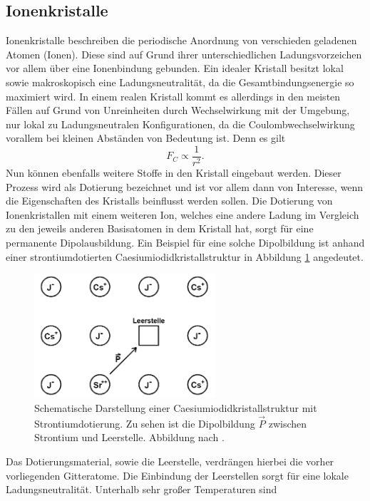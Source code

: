 \subsection{Ionenkristalle}
Ionenkristalle beschreiben die periodische Anordnung von verschieden geladenen Atomen (Ionen). Diese sind auf Grund ihrer unterschiedlichen Ladungsvorzeichen vor allem über eine Ionenbindung 
gebunden. Ein idealer Kristall besitzt lokal sowie makroskopisch eine Ladungsneutralität, da die Gesamtbindungsenergie so maximiert wird. In einem realen Kristall kommt es allerdings in den meisten Fällen auf Grund von 
Unreinheiten durch Wechselwirkung mit der Umgebung,
nur lokal zu Ladungsneutralen Konfigurationen, da die Coulombwechselwirkung vorallem bei kleinen Abständen von Bedeutung ist. Denn es gilt
\begin{equation*}
F_{C} \propto \frac{1}{r^2}.
\end{equation*}
\newline
Nun können ebenfalls weitere Stoffe in den Kristall eingebaut werden. Dieser Prozess wird als Dotierung bezeichnet und ist vor allem dann von Interesse, wenn die Eigenschaften des Kristalls 
beinflusst werden sollen. Die Dotierung von Ionenkristallen mit einem weiteren Ion, welches eine andere Ladung im Vergleich zu den jeweils anderen Basisatomen in dem Kristall hat, sorgt für eine permanente Dipolausbildung.
Ein Beispiel für eine solche Dipolbildung ist anhand einer strontiumdotierten Caesiumiodidkristallstruktur in Abbildung \ref{fig:theo1} angedeutet.
\begin{figure}
    \centering
    \includegraphics[width=0.6\textwidth]{bilder/theo1.png}
    \caption{Schematische Darstellung einer Caesiumiodidkristallstruktur mit Strontiumdotierung. Zu sehen ist die Dipolbildung $\vec{P}$ zwischen Strontium und Leerstelle. Abbildung nach \cite{altskript}.
            }
    \label{fig:theo1}
\end{figure}
Das Dotierungsmaterial, sowie die Leerstelle, verdrängen hierbei die vorher vorliegenden Gitteratome. Die Einbindung der Leerstellen sorgt für eine lokale Ladungsneutralität. Unterhalb sehr großer Temperaturen sind
